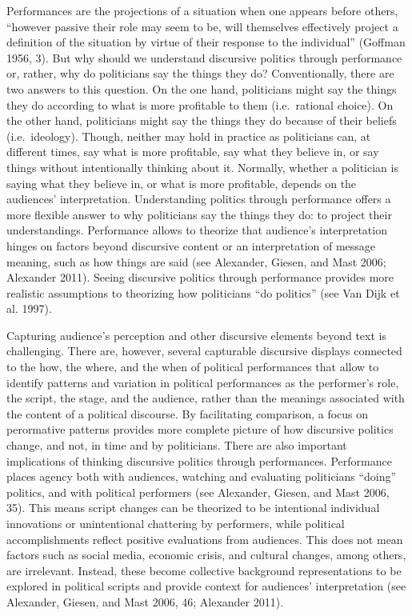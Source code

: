 \documentclass[
  12pt,
]{article}
\begin{document}
Performances are the projections of a situation when one appears before
others, ``however passive their role may seem to be, will themselves
effectively project a definition of the situation by virtue of their
response to the individual'' (Goffman 1956, 3). But why should we
understand discursive politics through performance or, rather, why do
politicians say the things they do? Conventionally, there are two
answers to this question. On the one hand, politicians might say the
things they do according to what is more profitable to them
(i.e.~rational choice). On the other hand, politicians might say the
things they do because of their beliefs (i.e.~ideology). Though, neither
may hold in practice as politicians can, at different times, say what is
more profitable, say what they believe in, or say things without
intentionally thinking about it. Normally, whether a politician is
saying what they believe in, or what is more profitable, depends on the
audiences' interpretation. Understanding politics through performance
offers a more flexible answer to why politicians say the things they do:
to project their understandings. Performance allows to theorize that
audience's interpretation hinges on factors beyond discursive content or
an interpretation of message meaning, such as how things are said (see
Alexander, Giesen, and Mast 2006; Alexander 2011). Seeing discursive
politics through performance provides more realistic assumptions to
theorizing how politicians ``do politics'' (see Van Dijk et al. 1997).

Capturing audience's perception and other discursive elements beyond
text is challenging. There are, however, several capturable discursive
displays connected to the how, the where, and the when of political
performances that allow to identify patterns and variation in political
performances as the performer's role, the script, the stage, and the
audience, rather than the meanings associated with the content of a
political discourse. By facilitating comparison, a focus on perormative
patterns provides more complete picture of how discursive politics
change, and not, in time and by politicians. There are also important
implications of thinking discursive politics through performances.
Performance places agency both with audiences, watching and evaluating
politicians ``doing'' politics, and with political performers (see
Alexander, Giesen, and Mast 2006, 35). This means script changes can be
theorized to be intentional individual innovations or unintentional
chattering by performers, while political accomplishments reflect
positive evaluations from audiences. This does not mean factors such as
social media, economic crisis, and cultural changes, among others, are
irrelevant. Instead, these become collective background representations
to be explored in political scripts and provide context for audiences'
interpretation (see Alexander, Giesen, and Mast 2006, 46; Alexander
2011).
\end{document}
